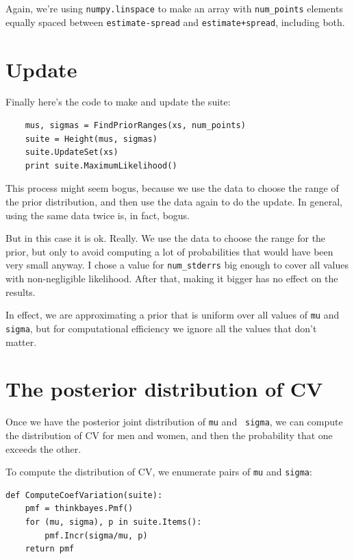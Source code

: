 \documentclass[12pt]{book}
\begin{document}
Again, we're using {\tt numpy.linspace} to make an array with
\verb"num_points" elements equally spaced between
{\tt estimate-spread} and {\tt estimate+spread}, including
both.


\section{Update}

Finally here's the code to make and update the suite:

\begin{verbatim}
    mus, sigmas = FindPriorRanges(xs, num_points)
    suite = Height(mus, sigmas)
    suite.UpdateSet(xs)
    print suite.MaximumLikelihood()    
\end{verbatim}

This process might seem bogus, because we use the data to choose the
range of the prior distribution, and then use the data again to do the
update.  In general, using the same data twice is, in fact, bogus.

But in this case it is ok.  Really.  We use the data to choose the
range for the prior, but only to avoid computing a lot of
probabilities that would have been very small anyway.  I chose a value
for \verb"num_stderrs" big enough to cover all values with
non-negligible likelihood.  After that, making it bigger has no effect
on the results.

In effect, we are approximating a prior that is uniform over all values 
of {\tt mu} and {\tt sigma}, but for computational efficiency
we ignore all the values that don't matter.

\section{The posterior distribution of CV}

Once we have the posterior joint distribution of {\tt mu} and {\tt
  sigma}, we can compute the distribution of CV for men and women, and
then the probability that one exceeds the other.

To compute the distribution of CV, we enumerate pairs of
{\tt mu} and {\tt sigma}:

\begin{verbatim}
def ComputeCoefVariation(suite):
    pmf = thinkbayes.Pmf()
    for (mu, sigma), p in suite.Items():
        pmf.Incr(sigma/mu, p)
    return pmf
\end{verbatim}
\end{document}
